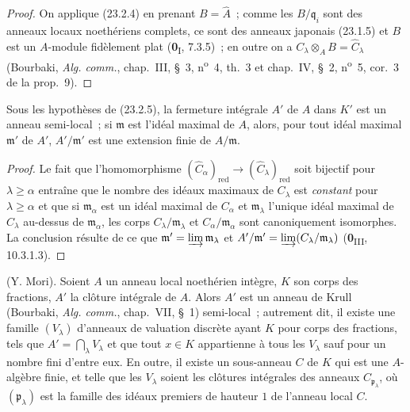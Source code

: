 
\begin{proof}
On applique (23.2.4) en prenant $B=\widehat A$~; comme les
$B/\mathfrak q_i$ sont des anneaux locaux noethériens complets, ce sont des
anneaux japonais (23.1.5) et $B$ est un $A$-module fidèlement plat
(\textbf{0}\textsubscript{I}, 7.3.5)~; en outre on a
$C_\lambda\otimes_AB=\widehat C_\lambda$ (Bourbaki, \emph{Alg. comm.},
chap.~III, §~3, n\textsuperscript{o}~4, th.~3 et chap.~IV, §~2,
n\textsuperscript{o}~5, cor.~3 de la prop.~9).
\end{proof}

\begin{corollary}[23.2.6]
\label{0.23.2.6-fr}
Sous les hypothèses de \textup{(23.2.5)}, la fermeture intégrale $A'$ de $A$ dans
$K'$ est un anneau semi-local~; si $\mathfrak m$ est l'idéal maximal de $A$,
alors, pour tout idéal maximal $\mathfrak m'$ de $A'$,
$A'/\mathfrak m'$ est une extension finie de $A/\mathfrak m$.
\end{corollary}

\begin{proof}
Le fait que l'homomorphisme
$(\widehat C_\alpha)_{\mathrm{red}}\to
(\widehat C_\lambda)_{\mathrm{red}}$ soit bijectif pour
$\lambda\geqslant\alpha$ entraîne que le nombre des idéaux maximaux de
$C_\lambda$ est \emph{constant} pour $\lambda\geqslant\alpha$ et que si
$\mathfrak m_\alpha$ est un idéal maximal de $C_\alpha$ et
$\mathfrak m_\lambda$ l'unique idéal maximal de $C_\lambda$ au-dessus de
$\mathfrak m_\alpha$, les corps $C_\lambda/\mathfrak m_\lambda$ et
$C_\alpha/\mathfrak m_\alpha$ sont canoniquement isomorphes. La conclusion
résulte de ce que $\mathfrak m'=\varinjlim\mathfrak m_\lambda$ et
$A'/\mathfrak m'=\varinjlim(C_\lambda/\mathfrak m_\lambda)$
(\textbf{0}\textsubscript{III}, 10.3.1.3).
\end{proof}

\begin{proposition}[23.2.7]
\label{0.23.2.7-fr}
\textnormal{(Y. Mori).} Soient $A$ un anneau local noethérien intègre, $K$ son
corps des fractions, $A'$ la clôture intégrale de $A$. Alors $A'$ est un
anneau de Krull \textup{(Bourbaki, \emph{Alg. comm.}, chap.~VII, §~1)} semi-local~;
autrement dit, il existe une famille $(V_\lambda)$ d'anneaux de valuation
discrète ayant $K$ pour corps des fractions, tels que
$A'=\bigcap_\lambda V_\lambda$ et que tout $x\in K$ appartienne à tous les
$V_\lambda$ sauf pour un nombre fini d'entre eux. En outre, il existe un
sous-anneau $C$ de $K$ qui est une $A$-algèbre finie, et telle que les
$V_\lambda$ soient les clôtures intégrales des anneaux
$C_{\mathfrak p_\lambda}$, où $(\mathfrak p_\lambda)$ est la famille des
idéaux premiers de hauteur $1$ de l'anneau local $C$.
\end{proposition}

